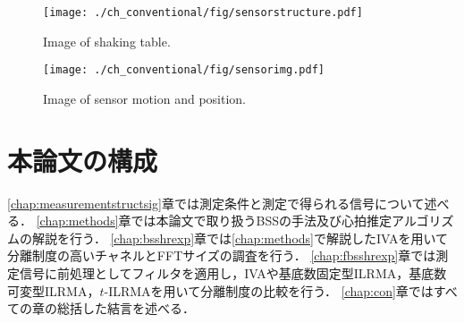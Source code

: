 \begin{figure}[htbp]
 \begin{minipage}{0.5\hsize}
  \begin{center}
   \texttt{[image: ./ch\_conventional/fig/sensorstructure.pdf]}
  \end{center}
  \caption{Image of shaking table.}
  \label{fig:sensorstructure}
 \end{minipage}
 \begin{minipage}{0.5\hsize}
  \begin{center}
   \texttt{[image: ./ch\_conventional/fig/sensorimg.pdf]}
  \end{center}
  \caption{Image of sensor motion and position.}
  \label{fig:sensorimg}
 \end{minipage}
\end{figure}


\section{本論文の構成}
\ref{chap:measurementstructsig}章では測定条件と測定で得られる信号について述べる．
\ref{chap:methods}章では本論文で取り扱うBSSの手法及び心拍推定アルゴリズムの解説を行う．
\ref{chap:bsshrexp}章では\ref{chap:methods}で解説したIVAを用いて分離制度の高いチャネルとFFTサイズの調査を行う．
\ref{chap:fbsshrexp}章では測定信号に前処理としてフィルタを適用し，IVAや基底数固定型ILRMA，基底数可変型ILRMA，$t$-ILRMAを用いて分離制度の比較を行う．
\ref{chap:con}章ではすべての章の総括した結言を述べる．